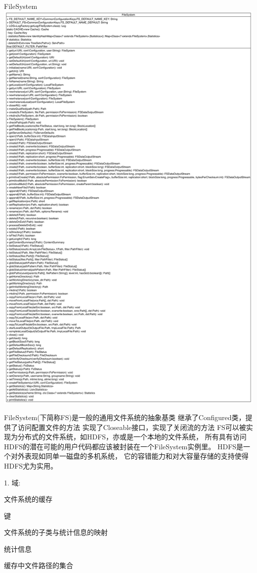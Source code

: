 \begin{XeClass}{FileSystem}
\includegraphics[width=\textwidth]{cdig/FileSystem.png}
     
 FileSystem(下简称FS)是一般的通用文件系统的抽象基类
 继承了Configured类，提供了访问配置文件的方法
 实现了Closeable接口，实现了关闭流的方法
 FS可以被实现为分布式的文件系统，如HDFS，亦或是一个本地的文件系统，
 所有具有访问HDFS的潜在可能的用户代码都应该被封装在一个FileSystem实例里。
 HDFS是一个对外表现如同单一磁盘的多机系统，
 它的容错能力和对大容量存储的支持使得HDFS尤为实用。
 
 1. 域:
 \begin{XeEnum}
 \item 文件系统的缓存
 \item 键
 \item 文件系统的子类与统计信息的映射
 \item 统计信息
 \item 缓存中文件路径的集合
 \end{XeEnum}
 

\end{XeClass}
